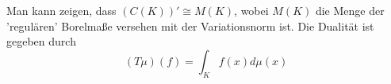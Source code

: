 \begin{bemerkung}
	Man kann zeigen, dass $(C(K))' \cong M(K)$, wobei $M(K)$ die Menge der 'regulären' Borelma{\ss}e versehen mit der Variationsnorm ist. Die Dualität ist gegeben durch
	\[ (T \mu)(f) = \int_{K} f(x) d\mu(x) \]
\end{bemerkung}



\newpage